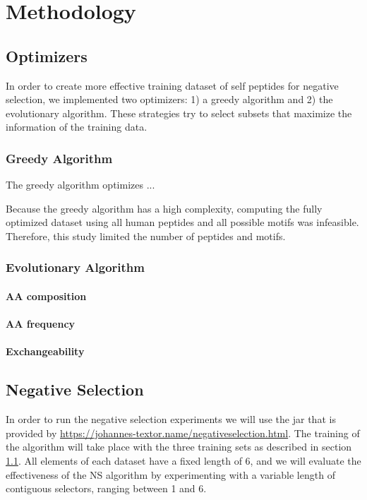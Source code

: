 \documentclass{article}
\begin{document}
\cite{wortel2020t}


\section{Methodology}

\subsection{Optimizers} \label{optimizers}

In order to create more effective training dataset of self peptides for negative selection, we implemented two optimizers: 
1) a greedy algorithm and 2) the evolutionary algorithm. These strategies try to select subsets that maximize the information of the training data.



\subsubsection{Greedy Algorithm}

The greedy algorithm optimizes ...

Because the greedy algorithm has a high complexity, computing the fully optimized dataset using all human peptides and
all possible motifs was infeasible. Therefore, this study limited the number of peptides and motifs.


\subsubsection{Evolutionary Algorithm} 

\paragraph{AA composition}



\paragraph{AA frequency}

\paragraph{Exchangeability}


\subsection{Negative Selection}
In order to run the negative selection experiments we will use the jar that is provided by \url{https://johannes-textor.name/negativeselection.html}.
The training of the algorithm will take place with the three training sets as described in section \ref{optimizers}.
All elements of each dataset have a fixed length of 6, and we will evaluate the effectiveness of the NS algorithm by 
experimenting  with a variable length of contiguous selectors, ranging between 1 and 6. 
\end{document}

